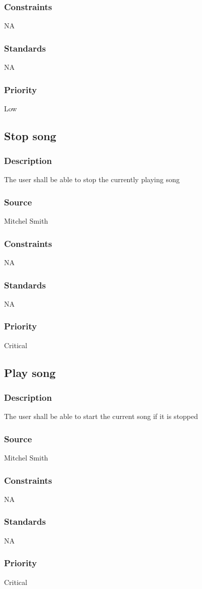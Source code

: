 \subsubsection{Constraints}
NA
\subsubsection{Standards}
NA
\subsubsection{Priority}
Low


\subsection{Stop song}
\subsubsection{Description}
The user shall be able to stop the currently playing song
\subsubsection{Source}
Mitchel Smith
\subsubsection{Constraints}
NA
\subsubsection{Standards}
NA
\subsubsection{Priority}
Critical


\subsection{Play song}
\subsubsection{Description}
The user shall be able to start the current song if it is stopped
\subsubsection{Source}
Mitchel Smith
\subsubsection{Constraints}
NA
\subsubsection{Standards}
NA
\subsubsection{Priority}
Critical
